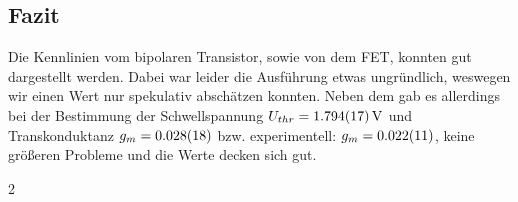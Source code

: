\documentclass[10pt]{article}
\begin{document}
\begin{multicols}{2}
  \section{Fazit}
  Die Kennlinien vom bipolaren Transistor, sowie von dem FET, konnten gut dargestellt werden. Dabei war leider die Ausführung etwas ungründlich, weswegen wir einen Wert nur spekulativ abschätzen konnten. Neben dem gab es allerdings bei der Bestimmung der Schwellspannung $U_{thr}=\SI{1.794+-0.017}{V}$ und Transkonduktanz $g_m=\SI{0.028+-0.018}{}$ bzw. experimentell: $g_m=\SI{0.022+-0.011}{}$, keine größeren Probleme und die Werte decken sich gut.

\end{multicols}{2}
\clearpage
\listoffigures
\listoftables



\end{document}
